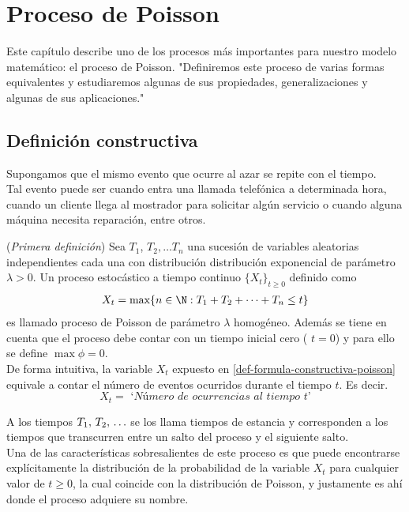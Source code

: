 \section{Proceso de Poisson}
\label{procPoisson-chapter}
Este capítulo describe uno de los procesos más importantes para nuestro modelo matemático: el proceso de Poisson. 
"Definiremos este proceso de varias formas equivalentes y estudiaremos algunas de sus propiedades, generalizaciones y algunas de sus aplicaciones."
\subsection{Definición constructiva}
    Supongamos que el mismo evento que ocurre al azar se repite con el tiempo. \\ 
    Tal evento puede ser cuando entra una llamada telefónica a determinada hora, cuando un cliente llega al mostrador para solicitar algún servicio o cuando alguna máquina necesita reparación, entre otros.
    \begin{Def}(\textit{Primera definición})
        Sea $T_1$, $T_2, \ldots T_n$ una sucesión de variables aleatorias independientes cada una con distribución distribución exponencial de parámetro $\lambda>0$. Un proceso estocástico a tiempo continuo $\{X_t\}_{t\geq 0}$ definido como
        \begin{eqnarray}
            X_t = \max \{ n\in\N : T_1+T_2+\cdots+T_n \leq t\}
            \label{def-formula-constructiva-poisson}
        \end{eqnarray}
        es llamado proceso de Poisson de parámetro $\lambda$ homogéneo.
        Además se tiene en cuenta que el proceso debe contar con un tiempo inicial cero ( $t=0$) y para ello se define $\max \phi=0$.\\
        De forma intuitiva, la variable $X_t$ expuesto en \ref{def-formula-constructiva-poisson}  equivale a contar el número de eventos ocurridos durante el tiempo $t$. Es decir.
        $$X_t = \textit{ `Número de ocurrencias al tiempo $t$'}$$
        \label{def-procesoPoison-constructiva}
    \end{Def}
    A los tiempos $T_1 ,\thinspace T_2,\thinspace\ldots$ se los llama tiempos de estancia y corresponden a los tiempos que transcurren entre un salto del proceso y el siguiente salto.\\
    Una de las características sobresalientes de este proceso es que puede encontrarse explícitamente la distribución de la probabilidad de la variable $X_t$ para cualquier valor de $t\geq 0$, la cual coincide con la distribución de Poisson, y justamente es ahí donde el proceso adquiere su nombre.
